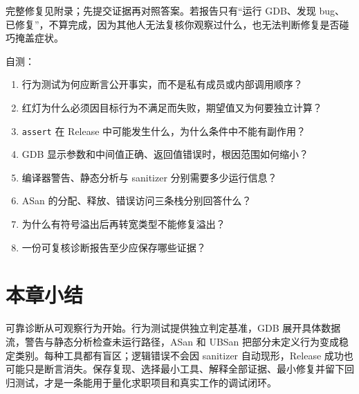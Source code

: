 完整修复见附录；先提交证据再对照答案。若报告只有“运行 GDB、发现 bug、已修复”，不算完成，因为其他人无法复核你观察过什么，也无法判断修复是否碰巧掩盖症状。

自测：

\begin{enumerate}
  \item 行为测试为何应断言公开事实，而不是私有成员或内部调用顺序？
  \item 红灯为什么必须因目标行为不满足而失败，期望值又为何要独立计算？
  \item \texttt{assert} 在 Release 中可能发生什么，为什么条件中不能有副作用？
  \item GDB 显示参数和中间值正确、返回值错误时，根因范围如何缩小？
  \item 编译器警告、静态分析与 sanitizer 分别需要多少运行信息？
  \item ASan 的分配、释放、错误访问三条栈分别回答什么？
  \item 为什么有符号溢出后再转宽类型不能修复溢出？
  \item 一份可复核诊断报告至少应保存哪些证据？
\end{enumerate}


\enlargethispage{4\baselineskip}
\section{本章小结}

可靠诊断从可观察行为开始。行为测试提供独立判定基准，GDB 展开具体数据流，警告与静态分析检查未运行路径，ASan 和 UBSan 把部分未定义行为变成稳定类别。每种工具都有盲区；逻辑错误不会因 sanitizer 自动现形，Release 成功也可能只是断言消失。保存复现、选择最小工具、解释全部证据、最小修复并留下回归测试，才是一条能用于量化求职项目和真实工作的调试闭环。

